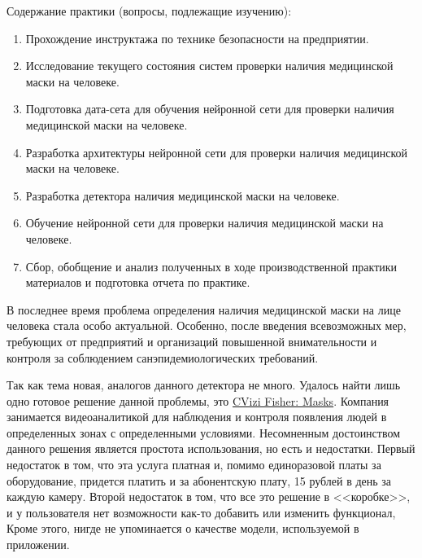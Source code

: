 \documentclass[a4paper,14pt]{article}
\begin{document}
	Содержание практики (вопросы, подлежащие изучению):
	
	\begin{enumerate}
		
		\item Прохождение инструктажа по технике безопасности на предприятии.
		
		\item Исследование текущего состояния систем проверки наличия медицинской маски на человеке.
		
		\item Подготовка дата-сета для обучения нейронной сети для проверки наличия медицинской маски на человеке.
		
		\item Разработка архитектуры нейронной сети для проверки наличия медицинской маски на человеке.
		
		\item Разработка детектора наличия медицинской маски на человеке.
		
		\item Обучение нейронной сети для проверки наличия медицинской маски на человеке.
		
		\item Сбор, обобщение и анализ полученных в ходе производственной практики материалов и подготовка отчета по практике.
		
	\end{enumerate}
	
	В последнее время проблема определения наличия медицинской маски на лице человека стала особо актуальной.
	Особенно, после введения всевозможных мер, требующих от предприятий и организаций повышенной внимательности и контроля за соблюдением санэпидемиологических требований.
	
	Так как тема новая, аналогов данного детектора не много.
	Удалось найти лишь одно готовое решение данной проблемы, это \href{https://fisher.cvizi.com/#solutions}{CVizi Fisher: Masks}.
	Компания занимается видеоаналитикой для наблюдения и контроля появления людей в определенных зонах с определенными условиями. 
	Несомненным достоинством данного решения является простота использования, но есть и недостатки.
	Первый недостаток в том, что эта услуга платная и, помимо единоразовой платы за оборудование, придется платить и за абонентскую плату, 15 рублей в день за каждую камеру.
	Второй недостаток в том, что все это решение в <<коробке>>, и у пользователя нет возможности как-то добавить или изменить функционал,
	Кроме этого, нигде не упоминается о качестве модели, используемой в приложении.
	
\end{document}
